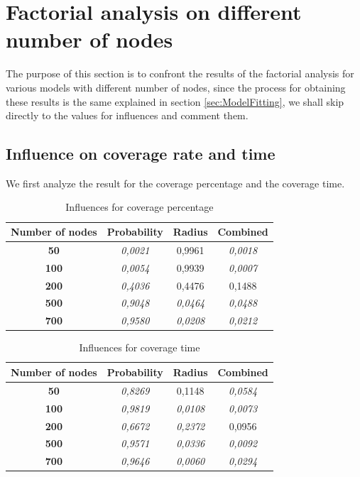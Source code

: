 \section{Factorial analysis on different number of nodes}
The purpose of this section is to confront the results of the factorial analysis for various models with different number of nodes, since the process for obtaining these results is the same explained in section \ref{sec:ModelFitting}, we shall skip directly to the values for influences and comment them.
\subsection{Influence on coverage rate and time}
We first analyze the result for the coverage percentage and the coverage time.

\begin{table}[H]\label{tab:CovPerc}
\centering
\begin{tabular}{|c|c|c|c|}
\hline
\textbf{Number of   nodes} & \textbf{Probability} & \textbf{Radius} & \textbf{Combined} \\ \hline
\textbf{50} & \textit{0,0021} & 0,9961 & \textit{0,0018} \\ \hline
\textbf{100} & \textit{0,0054} & 0,9939 & \textit{0,0007} \\ \hline
\textbf{200} & \textit{0,4036} & 0,4476 & 0,1488 \\ \hline
\textbf{500} & \textit{0,9048} & \textit{0,0464} & \textit{0,0488} \\ \hline
\textbf{700} & \textit{0,9580} & \textit{0,0208} & \textit{0,0212} \\ \hline
\end{tabular}
\caption{Influences for coverage percentage}
\end{table}

\begin{table}[H]\label{tab:CovTime}
\centering
\begin{tabular}{|c|c|c|c|}
\hline
\textbf{Number of   nodes} & \textbf{Probability} & \textbf{Radius} & \textbf{Combined} \\ \hline
\textbf{50} & \textit{0,8269} & 0,1148 & \textit{0,0584} \\ \hline
\textbf{100} & \textit{0,9819} & \textit{0,0108} & \textit{0,0073} \\ \hline
\textbf{200} & \textit{0,6672} & \textit{0,2372} & 0,0956 \\ \hline
\textbf{500} & \textit{0,9571} & \textit{0,0336} & \textit{0,0092} \\ \hline
\textbf{700} & \textit{0,9646} & \textit{0,0060} & \textit{0,0294} \\ \hline
\end{tabular}
\caption{Influences for coverage time}
\end{table}


